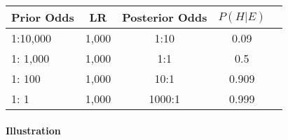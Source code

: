 \documentclass[10pt]{article}
\begin{document}
\vspace{2mm}
\hspace{0.5cm}
\begin{centering}
\begin{tabular}{lcccc}
\hline
Prior Odds & LR  &  Posterior Odds &  $P(H | E)$ \\
\hline
1:10,000 & 1,000 & 1:10 & 0.09  \\
1: 1,000  & 1,000&  1:1 &0.5 \\
1: 100 & 1,000 &  10:1 &  0.909 \\
1: 1 & 1,000 &  1000:1 &  0.999 \\
\hline
\end{tabular}
\end{centering}
\vspace{2mm}


\paragraph{Illustration}
\end{document}
